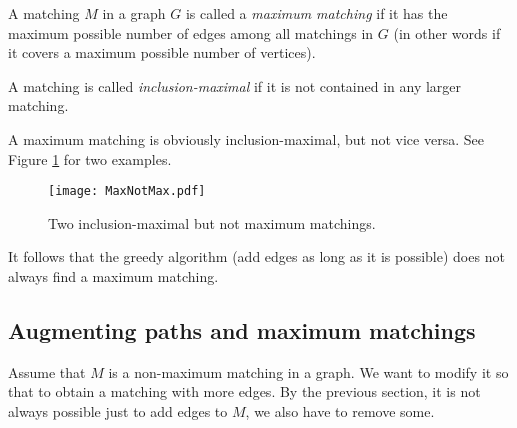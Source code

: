 \begin{page}
\setcounter{section}{4}
\setcounter{subsection}{1}
\setcounter{dfn}{2}
\label{portion:324}

\begin{dfn}
A matching $M$ in a graph $G$ is called a \emph{maximum matching} if it has the maximum possible number of edges among all matchings in $G$
(in other words if it covers a maximum possible number of vertices).

A matching is called \emph{inclusion-maximal} if it is not contained in any larger matching.
\end{dfn}

\end{page}

\begin{page}
\setcounter{section}{4}
\setcounter{subsection}{2}
\setcounter{dfn}{2}
\label{portion:325}


A maximum matching is obviously inclusion-maximal, but not vice versa.
See Figure \ref{fig:MaxNotMax} for two examples.

\begin{figure}[ht]
\begin{center}
\texttt{[image: MaxNotMax.pdf]}
\end{center}
\caption{Two inclusion-maximal but not maximum matchings.}
\label{fig:MaxNotMax}
\end{figure}

It follows that the greedy algorithm (add edges as long as it is possible) does not always find a maximum matching.




\end{page}

\begin{page}
\setcounter{section}{4}
\setcounter{subsection}{2}
\setcounter{dfn}{2}
\label{portion:326}

\subsection{Augmenting paths and maximum matchings}
Assume that $M$ is a non-maximum matching in a graph.
We want to modify it so that to obtain a matching with more edges.
By the previous section, it is not always possible just to add edges to $M$, we also have to remove some.


\end{page}

